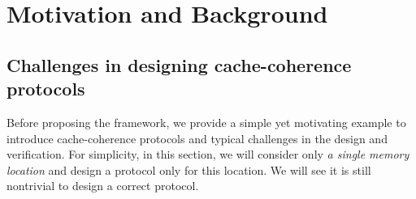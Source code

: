 \section{Motivation and Background}

\subsection{Challenges in designing cache-coherence protocols}
\label{sec-example}

Before proposing the \hemiola{} framework, we provide a simple yet motivating example to introduce cache-coherence protocols and typical challenges in the design and verification.
For simplicity, in this section, we will consider only \emph{a single memory location} and design a protocol only for this location.
We will see it is still nontrivial to design a correct protocol.

